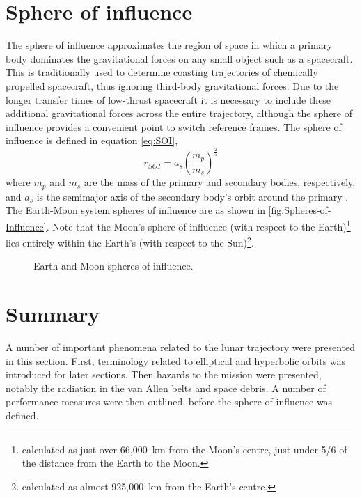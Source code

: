 \section{Sphere of influence} \label{sec:SOI}
The sphere of influence approximates the region of space in which a primary body dominates the gravitational forces on any small object such as a spacecraft. This is traditionally used to determine coasting trajectories of chemically propelled spacecraft, thus ignoring third-body gravitational forces. Due to the longer transfer times of low-thrust spacecraft it is necessary to include these additional gravitational forces across the entire trajectory, although the sphere of influence provides a convenient point to switch reference frames. The sphere of influence is defined in equation \eqref{eq:SOI},
\begin{equation}
r_{SOI}=a_{s}\left(\frac{m_{p}}{m_{s}}\right)^{\frac{2}{5}} \label{eq:SOI}
\end{equation}
where $m_{p}$ and $m_{s}$ are the mass of the primary and secondary bodies, respectively, and $a_{s}$ is the semimajor axis of the secondary body's orbit around the primary \parencite{Kemble2006}. The Earth-Moon system spheres of influence are as shown in \autoref{fig:Spheres-of-Influence}.
 Note that the Moon's sphere of influence (with respect to the Earth)\footnote{calculated as just over 66,000~km from the Moon's centre, just under 5/6 of the distance from the Earth to the Moon.} lies entirely within the Earth's (with respect to the Sun)\footnote{calculated as almost 925,000~km from the Earth's centre.}.

\begin{figure} [h]
\centering
\def\svgwidth{\figurewidth}

\caption{Earth and Moon spheres of influence.} \label{fig:Spheres-of-Influence}
\end{figure}

\section{Summary} \label{sec:Rocket-science-summary}

A number of important phenomena related to the lunar trajectory were presented in this section. First, terminology related to elliptical and hyperbolic orbits was introduced for later sections. Then hazards to the mission were presented, notably the radiation in the van Allen belts and space debris. A number of performance measures were then outlined, before the sphere of influence was defined.
